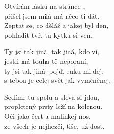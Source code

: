 
\ve{}
Otvírám lásku na stránce ,\\
přišel jsem milá má něco ti dát.\\
Zeptat se, co děláš a jakej byl den,\\
pohladit tvř, tu kytku si vem.

\cho{}
Ty jsi tak jiná, tak jiná, kdo ví,\\
jestli má touha tě neporaní,\\
ty jsi tak jiná, pojď, ruku mi dej,\\
s tebou je celej svět jak vyměněnej.

\ve{}
Sedíme tu spolu a slova si jdou,\\
propletený prsty leží na kolenou.\\
Oči jako čert a malinkej nos,\\
ze všech je nejhezčí, tiše, už dost.

\cho{}

\esong{}